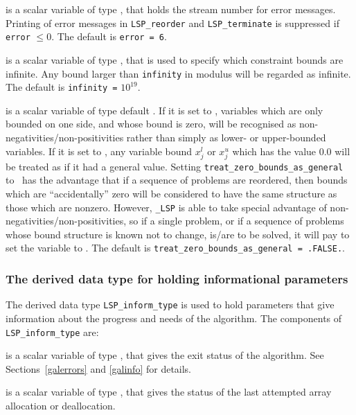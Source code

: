 \documentclass{galahad}
\newcommand{\packagename}{LSP}
\newcommand{\fullpackagename}{\libraryname\_\packagename}
\begin{document}
\begin{description}

 is a scalar variable of type \integer, that holds the
stream number for error messages. Printing of error messages in 
{\tt \packagename\_reorder} and {\tt \packagename\_terminate} 
is suppressed if {\tt error} $\leq 0$.
The default is {\tt error = 6}.

 is a scalar variable of type \realdp, that is used to
specify which constraint bounds are infinite.
Any bound larger than {\tt infinity} in modulus will be regarded as infinite.
The default is {\tt infinity =} $10^{19}$.

 is a scalar variable of type 
default \logical.
If it is set to \false, variables which 
are only bounded on one side, and whose bound is zero,
will be recognised as non-negativities/non-positivities rather than simply as
lower- or upper-bounded variables.
If it is set to \true, any variable bound 
$x_{j}^{l}$ or $x_{j}^{u}$ which has the value 0.0 will be
treated as if it had a general value.
Setting {\tt treat\_zero\_bounds\_as\_general} to \true\ has the advantage
that if a sequence of problems are reordered, then bounds which are
``accidentally'' zero will be considered to have the same structure as
those which are nonzero. However, {\tt \fullpackagename} is
able to take special advantage of non-negativities/non-positivities, so
if a single problem, or if a sequence of problems whose 
bound structure is known not to change, is/are to be solved, 
it will pay to set the variable to \false.
The default is {\tt treat\_zero\_bounds\_as\_general = .FALSE.}.

\end{description}


\subsubsection{The derived data type for holding informational
 parameters}\label{typeinform}
The derived data type 
{\tt \packagename\_inform\_type} 
is used to hold parameters that give information about the progress and needs 
of the algorithm. The components of 
{\tt \packagename\_inform\_type} 
are:

\begin{description}

 is a scalar variable of type \integer, that gives the
exit status of the algorithm. See Sections~\ref{galerrors} and \ref{galinfo}
for details.

 is a scalar variable of type \integer, that gives
the status of the last attempted array allocation or deallocation.

\end{description}
\end{document}
